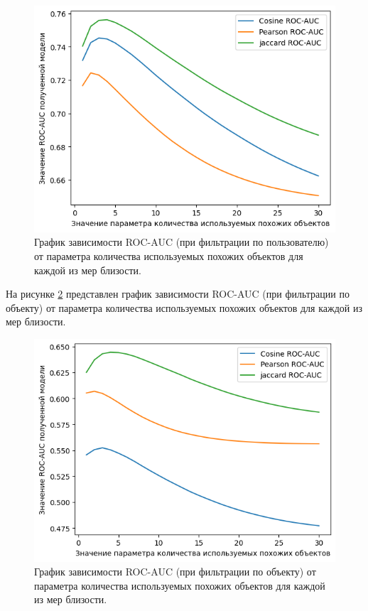 \begin{figure}[H]
	\centering
	\includegraphics[width=\textwidth]{inc/rocUser.png}
	\caption{ График зависимости ROC-AUC (при фильтрации по пользователю) от параметра количества используемых похожих объектов для каждой из мер близости.}
	\label{img:roc1}
\end{figure}

На рисунке \ref{img:roc2} представлен график зависимости ROC-AUC (при фильтрации по объекту) от параметра количества используемых похожих объектов для каждой из мер близости.

\begin{figure}[H]
	\centering
	\includegraphics[width=\textwidth]{inc/rocItem.png}
	\caption{ График зависимости ROC-AUC (при фильтрации по объекту) от параметра количества используемых похожих объектов для каждой из мер близости.}
	\label{img:roc2}
\end{figure}

